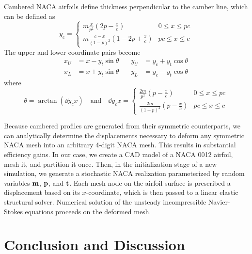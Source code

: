 \documentclass[11pt]{article}
\begin{document}
Cambered NACA airfoils define thickness perpendicular to the camber line, which can be defined as
\begin{equation}
y_c = \begin{cases}
m \frac{x}{p^2} \left( 2p-\frac{x}{c}\right) & 0 \le x \le pc \\
m \frac{c-x}{(1-p)^2} \left(1-2p+\frac{x}{c}\right) & pc \le x \le c
\end{cases}
\end{equation}
The upper and lower coordinate pairs become
\begin{equation}
\begin{aligned}
x_U &= x - y_t \sin \theta &\quad y_U &= y_c + y_t \cos \theta \\
x_L &= x + y_t \sin \theta &\quad y_L &= y_c - y_t \cos \theta
\end{aligned}
\end{equation}
where
\begin{equation}
\theta = \arctan \left( \dd{y_c}{x} \right)
\quad \text{and} \quad
\dd{y_c}{x} =
\begin{cases}
\frac{2m}{p^2} \left( p - \frac{x}{c} \right) & 0 \le x \le pc \\
\frac{2m}{(1-p)^2} \left( p - \frac{x}{c} \right) & pc \le x \le c
\end{cases}
\end{equation}

Because cambered profiles are generated from their symmetric counterparts, we can analytically determine the displacements necessary to deform any symmetric NACA mesh into an arbitrary 4-digit NACA mesh. This results in substantial efficiency gains. In our case, we create a CAD model of a NACA 0012 airfoil, mesh it, and partition it once. Then, in the initialization stage of a new simulation, we generate a stochastic NACA realization parameterized by random variables $\mb{m}$, $\mb{p}$, and $\mb{t}$. Each mesh node on the airfoil surface is prescribed a displacement based on its $x$-coordinate, which is then passed to a linear elastic structural solver. Numerical solution of the unsteady incompressible Navier-Stokes equations proceeds on the deformed mesh.

\section{Conclusion and Discussion}

\label{lastpage}
\end{document}
